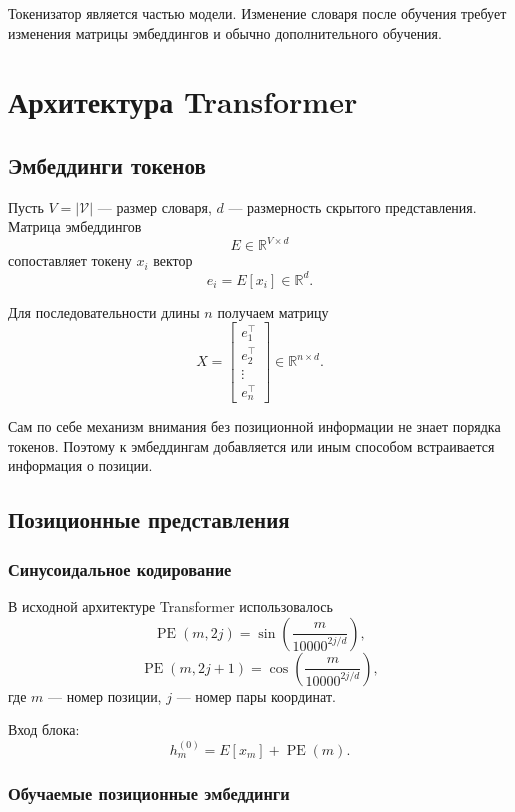 \documentclass[12pt,a4paper]{article}
\newcommand{\R}{\mathbb{R}}
\newcommand{\V}{\mathcal{V}}
\newcommand{\1}{\mathbf{1}}
\theoremstyle{definition}
\theoremstyle{remark}
\begin{document}
Токенизатор является частью модели. Изменение словаря после обучения
требует изменения матрицы эмбеддингов и обычно дополнительного обучения.

\section{Архитектура Transformer}

\subsection{Эмбеддинги токенов}

Пусть $V=|\V|$ --- размер словаря, $d$ --- размерность скрытого
представления. Матрица эмбеддингов
\[
E\in\R^{V\times d}
\]
сопоставляет токену $x_i$ вектор
\[
e_i=E[x_i]\in\R^d.
\]

Для последовательности длины $n$ получаем матрицу
\[
X=
\begin{bmatrix}
e_1^\top\\
e_2^\top\\
\vdots\\
e_n^\top
\end{bmatrix}
\in\R^{n\times d}.
\]

Сам по себе механизм внимания без позиционной информации не знает
порядка токенов. Поэтому к эмбеддингам добавляется или иным способом
встраивается информация о позиции.

\subsection{Позиционные представления}

\subsubsection{Синусоидальное кодирование}

В исходной архитектуре Transformer использовалось
\[
\operatorname{PE}(m,2j)
=
\sin\left(
\frac{m}{10000^{2j/d}}
\right),
\]
\[
\operatorname{PE}(m,2j+1)
=
\cos\left(
\frac{m}{10000^{2j/d}}
\right),
\]
где $m$ --- номер позиции, $j$ --- номер пары координат.

Вход блока:
\[
h_m^{(0)}=E[x_m]+\operatorname{PE}(m).
\]

\subsubsection{Обучаемые позиционные эмбеддинги}
\end{document}
